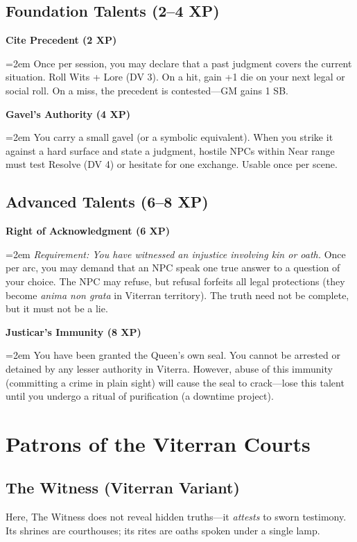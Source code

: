 \documentclass[11pt,twoside]{book}
\newcommand{\legalitem}[1]{\par\noindent\textbf{#1}\par\noindent\hangindent=2em\hangafter=1}
\newcommand{\ornament}{\par\centering\adforn{36}\par}
\begin{document}
\section{Foundation Talents (2--4 XP)}

\legalitem{Cite Precedent (2 XP)} Once per session, you may declare that a past judgment covers the current situation. Roll Wits + Lore (DV 3). On a hit, gain +1 die on your next legal or social roll. On a miss, the precedent is contested---GM gains 1 SB.

\legalitem{Gavel's Authority (4 XP)} You carry a small gavel (or a symbolic equivalent). When you strike it against a hard surface and state a judgment, hostile NPCs within Near range must test Resolve (DV 4) or hesitate for one exchange. Usable once per scene.

\section{Advanced Talents (6--8 XP)}

\legalitem{Right of Acknowledgment (6 XP)} \textit{Requirement: You have witnessed an injustice involving kin or oath.} Once per arc, you may demand that an NPC speak one true answer to a question of your choice. The NPC may refuse, but refusal forfeits all legal protections (they become \textit{anima non grata} in Viterran territory). The truth need not be complete, but it must not be a lie.

\legalitem{Justicar's Immunity (8 XP)} You have been granted the Queen's own seal. You cannot be arrested or detained by any lesser authority in Viterra. However, abuse of this immunity (committing a crime in plain sight) will cause the seal to crack---lose this talent until you undergo a ritual of purification (a downtime project).

\ornament

\chapter{Patrons of the Viterran Courts}

\section{The Witness (Viterran Variant)}

Here, The Witness does not reveal hidden truths---it \textit{attests} to sworn testimony. Its shrines are courthouses; its rites are oaths spoken under a single lamp.
\end{document}
